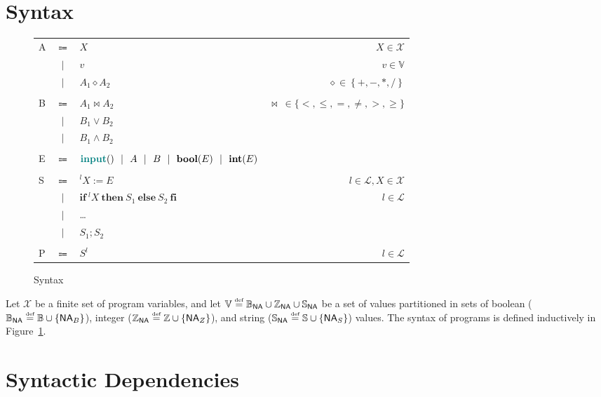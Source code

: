 \documentclass{article}
\newcommand{\defined}{\ensuremath{\stackrel{\mbox{\tiny def}}{=}}\xspace} %
\newcommand{\vars}{\ensuremath{\mathcal{X}}\xspace} %
\newcommand{\vals}{\ensuremath{\mathbb{V}}\xspace} %
\newcommand{\bvals}{\ensuremath{\mathbb{B}_\mathsf{NA}}\xspace} %
\newcommand{\bools}{\ensuremath{\mathbb{B}}\xspace} %
\newcommand{\bna}{\ensuremath{\mathsf{NA}_{B}}\xspace} %
\newcommand{\ivals}{\ensuremath{\mathbb{Z}_\mathsf{NA}}\xspace} %
\newcommand{\ints}{\ensuremath{\mathbb{Z}}\xspace} %
\newcommand{\ina}{\ensuremath{\mathsf{NA}_{Z}}\xspace} %
\newcommand{\svals}{\ensuremath{\mathbb{S}_\mathsf{NA}}\xspace} %
\newcommand{\strings}{\ensuremath{\mathbb{S}}\xspace} %
\newcommand{\sna}{\ensuremath{\mathsf{NA}_{S}}\xspace} %
\newcommand{\ipt}{\ensuremath{\mathsf{\mathbf{\color{teal}input}}()}\xspace} %
\newcommand{\set}[1]{\ensuremath{\left\{#1\right\}}\xspace} %
\newcommand{\labels}{\ensuremath{\mathcal{L}}\xspace} %
\begin{document}
\section*{Syntax}

\begin{figure}[t]
	\begin{center}
		\begin{tabular}{lclr}
			A &$\Coloneqq$& $X$ & $X\in 
			\vars$ 
			\\
			&$\vert$& $v$ & $v \in \vals$ \\
			&$\vert$& $A_1 \diamond A_2 $ &
			\hspace{3em}$\diamond \in 
			\set{+,-,*,/}$ 
			\\
			\\
			B & $\Coloneqq$& $A_1 \bowtie A_2$ 
			&
			$\bowtie~\in
			\{<, \leq, =, \not=, >, \geq\}$ \\
			&$\vert$ & $%
			B_1 \lor 
			B_2$ & \\
			&$\vert$& $B_1 
			\land B_2$ \\
			\\
			E &$\Coloneqq$& $\ipt~~\vert~~A~~\vert~~B~~\vert~~\mathsf{\mathbf{bool}}(E)~~\vert~~\mathsf{\mathbf{int}}(E)$ & \\
			\\
			S & $\Coloneqq$& $^lX := E$ & $l \in 
			\labels, X \in 
			\vars$ \\
			&$\vert$& 
			$\mathsf{\mathbf{if}}~^lX~\mathsf{\mathbf{then}}~S_1~\mathsf{\mathbf{else}}~S_2~\mathsf{\mathbf{fi}}$
			 & $l \in 
			 \labels$ \\
			 &$\vert$& \dots
			 & %
			 \\
			 &$\vert$&  $S_1 ; S_2$ & \\
			 \\
			 P & $\Coloneqq$& $S^l$ & $l \in 
			 \labels$
		\end{tabular}
	\end{center}
	\vspace{-1em}
	\caption{Syntax}\label{fig:syntax}
\end{figure}

Let \vars be a finite set of program variables, and let $\vals\defined\bvals \cup \ivals \cup \svals$ be a set of values partitioned  in sets of boolean ($\bvals \defined \bools \cup \{\bna\} $), integer ($\ivals \defined \ints \cup \{\ina\} $), and string ($\svals \defined \strings \cup \{\sna\} $) values. 
The syntax of programs is defined inductively in Figure~\ref{fig:syntax}.

\section*{Syntactic Dependencies}

\begin{align}


\end{align}
\end{document}
